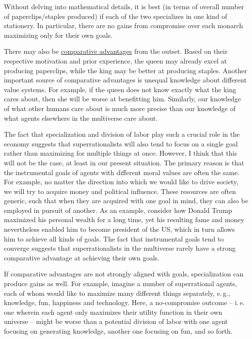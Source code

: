 Without delving into mathematical details, it is best (in terms of
overall number of paperclips/staples produced) if each of the two
specializes in one kind of stationery. In particular, there are no gains
from compromise over each monarch maximizing only for their own goals.

There may also be
\href{https://en.wikipedia.org/wiki/Comparative_advantage}{comparative
advantages} from the outset. Based on their respective motivation and
prior experience, the queen may already excel at producing paperclips,
while the king may be better at producing staples. Another important
source of comparative advantages is unequal knowledge about different
value systems. For example, if the queen does not know exactly what the
king cares about, then she will be worse at benefitting him. Similarly,
our knowledge of what other humans care about is much more precise than
our knowledge of what agents elsewhere in the multiverse care about.

The fact that specialization and division of labor play such a crucial
role in the economy suggests that superrationalists will also tend to
focus on a single goal rather than maximizing for multiple things at
once. However, I think that this will not be the case, at least in our
present situation. The primary reason is that the instrumental goals of
agents with different moral values are often the same. For example, no
matter the direction into which we would like to drive society, we will
try to acquire money and political influence. These resources are often
generic, such that when they are acquired with one goal in mind, they
can also be employed in pursuit of another. As an example, consider how
Donald Trump maximized his personal wealth for a long time, yet
his resulting fame and money nevertheless enabled him to become
president of the US, which in turn allows him to achieve all kinds of
goals. The fact that instrumental goals tend to converge suggests that
superrationalists in the multiverse rarely have a strong comparative
advantage at achieving their own goals.

If comparative advantages are not strongly aligned with goals,
specialization can produce gains as well. For example, imagine a number
of superrational agents, each of whom would like to maximize many
different things separately, e.\,g., knowledge, fun, happiness and
technology. Here, a no-compromise outcome -- i.\,e. one wherein each agent
only maximizes their utility function in their own universe -- might be
worse than a potential division of labor with one agent focusing on
generating knowledge, another one focusing on fun, and so forth.

